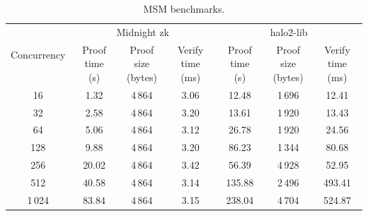 \documentclass{article}
\begin{document}
\begin{table}[htbp]
    \centering
    \caption{MSM benchmarks.}
    \label{tab:msm-comparison}
    \begingroup
    \setlength{\tabcolsep}{4pt}
    \renewcommand{\arraystretch}{1.2}
    \begin{tabular}{ccccccc}
        \toprule
        \multirow{2}{*}{Concurrency} & \multicolumn{3}{c}{Midnight zk} & \multicolumn{3}{c}{halo2-lib} \\
        \cmidrule(lr){2-4} \cmidrule(lr){5-7}
         & \shortstack{Proof time\\(s)} & \shortstack{Proof size\\(bytes)} & \shortstack{Verify time\\(ms)} & \shortstack{Proof time\\(s)} & \shortstack{Proof size\\(bytes)} & \shortstack{Verify time\\(ms)} \\
        \midrule
        16 & 1.32 & 4\,864 & 3.06 & 12.48 & 1\,696 & 12.41 \\
        32 & 2.58 & 4\,864 & 3.20 & 13.61 & 1\,920 & 13.43 \\
        64 & 5.06 & 4\,864 & 3.12 & 26.78 & 1\,920 & 24.56 \\
        128 & 9.88 & 4\,864 & 3.20 & 86.23 & 1\,344 & 80.68 \\
        256 & 20.02 & 4\,864 & 3.42 & 56.39 & 4\,928 & 52.95 \\
        512 & 40.58 & 4\,864 & 3.14 & 135.88 & 2\,496 & 493.41 \\
        1\,024 & 83.84 & 4\,864 & 3.15 & 238.04 & 4\,704 & 524.87 \\
        \bottomrule
    \end{tabular}
    \endgroup
\end{table}
\end{document}
